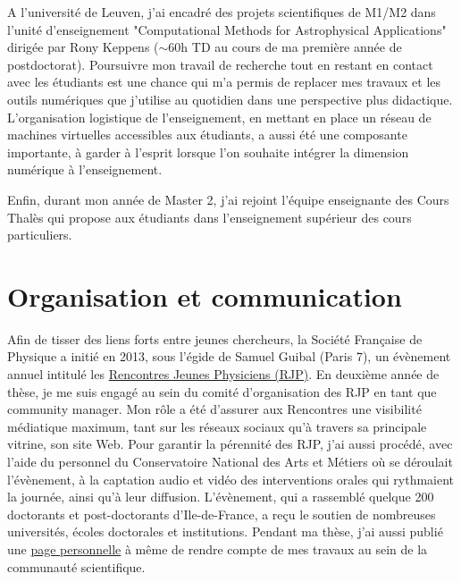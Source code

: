 \documentclass[a4paper,12pt,onecolumn]{article}
\begin{document}
\indent A l'université de Leuven, j'ai encadré des projets scientifiques de M1/M2 dans l'unité d'enseignement "Computational Methods for Astrophysical Applications" dirigée par Rony Keppens ($\sim$60h TD au cours de ma première année de postdoctorat). Poursuivre mon travail de recherche tout en restant en contact avec les étudiants est une chance qui m'a permis de replacer mes travaux et les outils numériques que j'utilise au quotidien dans une perspective plus didactique. L'organisation logistique de l'enseignement, en mettant en place un réseau de machines virtuelles accessibles aux étudiants, a aussi été une composante importante, à garder à l'esprit lorsque l'on souhaite intégrer la dimension numérique à l'enseignement.

\indent Enfin, durant mon année de Master 2, j'ai rejoint l'équipe enseignante des Cours Thalès qui propose aux étudiants dans l'enseignement supérieur des cours particuliers. 

\section*{Organisation et communication}

\indent \indent Afin de tisser des liens forts entre jeunes chercheurs, la Société Fran\c caise de Physique a initié en 2013, sous l'égide de Samuel Guibal (Paris 7), un évènement annuel intitulé les \href{http://rjp.sfp-paris.fr/index2015.html}{Rencontres Jeunes Physiciens (RJP)}. En deuxième année de thèse, je me suis engagé au sein du comité d'organisation des RJP en tant que community manager. Mon rôle a été d'assurer aux Rencontres une visibilité médiatique maximum, tant sur les réseaux sociaux qu'à travers sa principale vitrine, son site Web. Pour garantir la pérennité des RJP, j'ai aussi procédé, avec l'aide du personnel du Conservatoire National des Arts et Métiers où se déroulait l'évènement, à la captation audio et vidéo des interventions orales qui rythmaient la journée, ainsi qu'à leur diffusion. L'évènement, qui a rassemblé quelque 200 doctorants et post-doctorants d'Ile-de-France, a reçu le soutien de nombreuses universités, écoles doctorales et institutions. Pendant ma thèse, j'ai aussi publié une \href{http://homes.esat.kuleuven.be/~ileyk//index.html}{page personnelle} à même de rendre compte de mes travaux au sein de la communauté scientifique.
\end{document}
